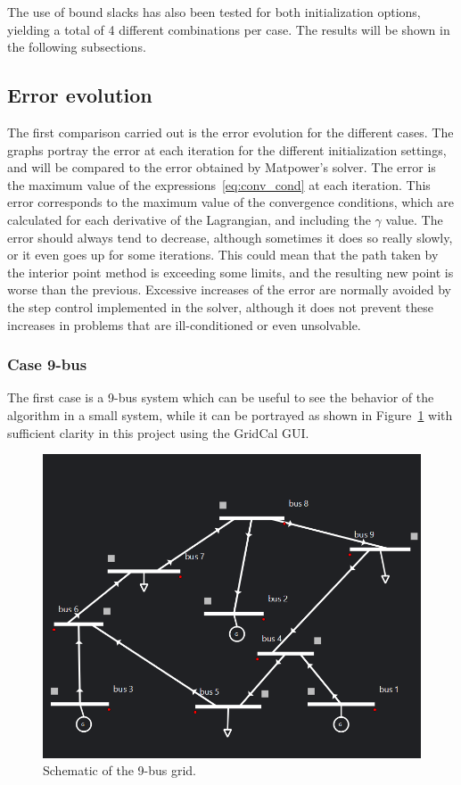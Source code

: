 The use of bound slacks has also been tested for both initialization options, yielding a total of 4 different combinations per case. The results will be shown in the following subsections.

\subsection{Error evolution}

The first comparison carried out is the error evolution for the different cases. The graphs portray the error at each iteration for the different initialization settings, and will be compared to the error obtained by Matpower's solver. The error is the maximum value
of the expressions~\eqref{eq:conv_cond} at each iteration. This error corresponds to the maximum value of the convergence conditions, which are
calculated for each derivative of the Lagrangian, and including the $\gamma$ value. The error should always tend to decrease, although sometimes it does so really slowly, or it even goes up for some iterations. 
This could mean that the path taken by the interior point method is exceeding some limits, and the resulting new point is worse than the previous.
Excessive increases of the error are normally avoided by the step control implemented in the solver, although it does not prevent these increases in problems that are ill-conditioned or
even unsolvable.

\subsubsection{Case 9-bus}

The first case is a 9-bus system \cite{chow1982time} which can be useful to see the behavior of the algorithm in a small system, while it can be portrayed as shown in Figure~\ref{fig:case9topo} with sufficient clarity in this project using the GridCal GUI. %


\begin{figure}[H]
  \centering
  \includegraphics[width= 250 px]{Images/case9_topo.png}
  \caption{Schematic of the 9-bus grid.}
  \label{fig:case9topo}
\end{figure}

